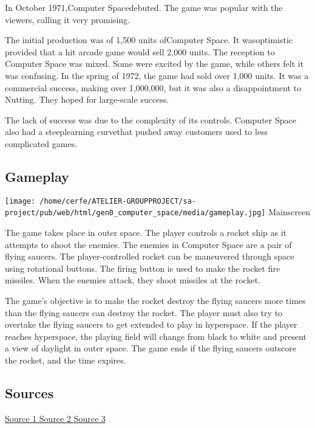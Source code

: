 \documentclass[a4paper,10pt]{book}
\begin{document}
            In October 1971,Computer Spacedebuted. The game was popular with the viewers, calling it very promising.
           
 
            The initial production was of 1,500 units ofComputer Space. It wasoptimistic provided that a hit arcade game would sell 2,000 units. 
            The reception to Computer Space was mixed. Some were excited by the game, while others felt it was confusing. 
            In the spring of 1972, the game had sold over 1,000 units. It was a commercial success, making over 1,000,000, but it was also a disappointment to Nutting. They hoped for large-scale success.
           
 
            The lack of success was due to the complexity of its controls. Computer Space also had a steeplearning curvethat pushed away customers used to less complicated games.
           
 
 \subsection{Gameplay }
 
 \texttt{[image: /home/cerfe/ATELIER-GROUPPROJECT/sa-project/pub/web/html/gen0\_computer\_space/media/gameplay.jpg]}
 Mainscreen 
 
 
            The game takes place in outer space. The player controls a rocket ship as it attempts to shoot the enemies. The enemies in Computer Space are a pair of flying saucers. 
            The player-controlled rocket can be maneuvered through space using rotational buttons. The firing button is used to make the rocket fire missiles. When the enemies attack, they shoot missiles at the rocket.
           
 
            The game's objective is to make the rocket destroy the flying saucers more times than the flying saucers can destroy the rocket. 
            The player must also try to overtake the flying saucers to get extended to play in hyperspace. If the player reaches hyperspace, the playing field will change from black to white and present a view of daylight in outer space. 
            The game ends if the flying saucers outscore the rocket, and the time expires.
           
 
 
 
 \subsection{Sources }
 
 \href{https://en.wikipedia.org/wiki/Computer_Space}{Source 1 }
 \href{https://www.arcade-museum.com/game_detail.php?game_id=7381}{Source 2 }
 \href{https://www.technologizer.com/2011/12/11/computer-space-and-the-dawn-of-the-arcade-video-game/}{Source 3 }
 
\end{document}
